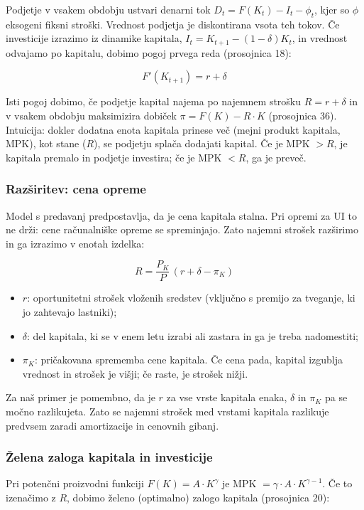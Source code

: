 \documentclass[12pt,a4paper]{article}
\begin{document}
Podjetje v vsakem obdobju ustvari denarni tok $D_t = F(K_t) - I_t - \phi_t$, kjer so $\phi$ eksogeni fiksni stroški. Vrednost podjetja je diskontirana vsota teh tokov. Če investicije izrazimo iz dinamike kapitala, $I_t = K_{t+1} - (1 - \delta)K_t$, in vrednost odvajamo po kapitalu, dobimo pogoj prvega reda (prosojnica 18):

\[
F'(K_{t+1}) = r + \delta
\]

Isti pogoj dobimo, če podjetje kapital najema po najemnem strošku $R = r + \delta$ in v vsakem obdobju maksimizira dobiček $\pi = F(K) - R \cdot K$ (prosojnica 36). Intuicija: dokler dodatna enota kapitala prinese več (mejni produkt kapitala, MPK), kot stane ($R$), se podjetju splača dodajati kapital. Če je MPK $> R$, je kapitala premalo in podjetje investira; če je MPK $< R$, ga je preveč.

\subsubsection{Razširitev: cena opreme}

Model s predavanj predpostavlja, da je cena kapitala stalna. Pri opremi za UI to ne drži: cene računalniške opreme se spreminjajo. Zato najemni strošek razširimo \citep{Jorgenson1963} in ga izrazimo v enotah izdelka:

\[
R = \frac{P_K}{P}\,(r + \delta - \pi_K)
\]

\begin{itemize}
\item $r$: oportunitetni strošek vloženih sredstev (vključno s premijo za tveganje, ki jo zahtevajo lastniki);
\item $\delta$: del kapitala, ki se v enem letu izrabi ali zastara in ga je treba nadomestiti;
\item $\pi_K$: pričakovana sprememba cene kapitala. Če cena pada, kapital izgublja vrednost in strošek je višji; če raste, je strošek nižji.
\end{itemize}

Za naš primer je pomembno, da je $r$ za vse vrste kapitala enaka, $\delta$ in $\pi_K$ pa se močno razlikujeta. Zato se najemni strošek med vrstami kapitala razlikuje predvsem zaradi amortizacije in cenovnih gibanj.

\subsubsection{Želena zaloga kapitala in investicije}

Pri potenčni proizvodni funkciji $F(K) = A \cdot K^{\gamma}$ je MPK $= \gamma \cdot A \cdot K^{\gamma - 1}$. Če to izenačimo z $R$, dobimo želeno (optimalno) zalogo kapitala (prosojnica 20):
\end{document}
